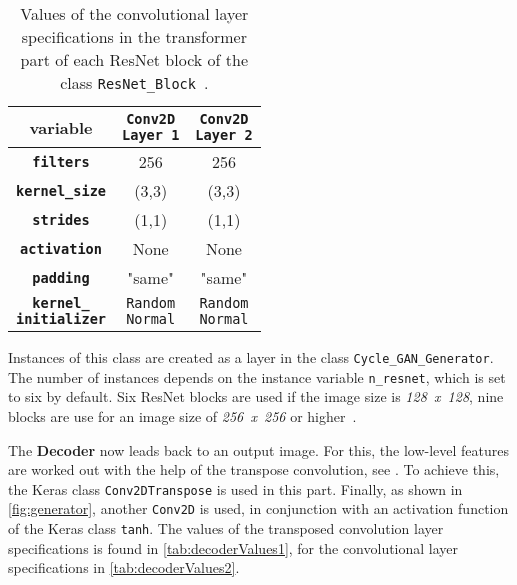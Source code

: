 \documentclass[fleqn,10pt]{SelfArx} %
\begin{document}
\begin{table}[htb]
\centering
\caption{Values of the convolutional layer specifications in the transformer part of each \ac{ResNet} block of the class \texttt{ResNet\_Block}~\cite{image-to-image-ccan}.}
\label{tab:transformerValues}
\begin{tabular}{c c c}
\textbf{variable} & \makecell[cc]{\textbf{\texttt{Conv2D}} \\ \textbf{\texttt{Layer 1}}} & \makecell[cc]{\textbf{\texttt{Conv2D}} \\ \textbf{\texttt{Layer 2}}} \\ \hline
\textbf{\texttt{filters}} & 256 & 256 \\ \hline
\textbf{\texttt{kernel\_size}} & (3,3) & (3,3) \\ \hline
\textbf{\texttt{strides}} & (1,1) &  (1,1) \\ \hline
\textbf{\texttt{activation}} & None & None \\ \hline 
\textbf{\texttt{padding}} & "same" & "same" \\ \hline
\makecell[cc]{\textbf{\texttt{kernel\_}} \\ \textbf{\texttt{initializer}}} & \makecell[cc]{\texttt{Random} \\ \texttt{Normal}} & \makecell[cc]{\texttt{Random} \\ \texttt{Normal}} \\ \hline
\end{tabular}
\end{table}

Instances of this class are created as a layer in the class \texttt{Cycle\_GAN\_Generator}. The number of instances depends on the instance variable \texttt{n\_resnet}, which is set to six by default. Six \ac{ResNet} blocks are used if the image size is \textit{128~x~128}, nine blocks are use for an image size of \textit{256~x~256} or higher~\cite{image-to-image-ccan}.

The \textbf{Decoder} now leads back to an output image. For this, the low-level features are worked out with the help of the transpose convolution, see \cite{Introduction-to-Cycle-GANs}. To achieve this, the Keras class \texttt{Conv2DTranspose} is used in this part. Finally, as shown in \autoref{fig:generator}, another \texttt{Conv2D} is used, in conjunction with an activation function of the Keras class \texttt{tanh}. The values of the transposed convolution layer specifications is found in \autoref{tab:decoderValues1}, for the convolutional layer specifications in \autoref{tab:decoderValues2}.
\end{document}
